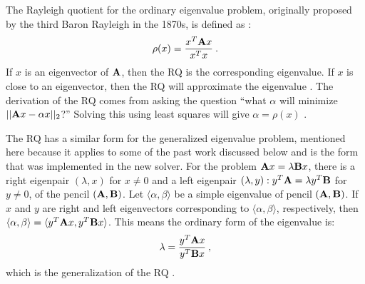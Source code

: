 The Rayleigh quotient for the ordinary eigenvalue problem, originally proposed by the third Baron Rayleigh in the 1870s, is defined as \cite{Parlett1974}:
%
\begin{equation}
  \rho(x) = \frac{x^{T}\mathbf{A}x}{x^{T}x} \:.
  \label{RQ}
\end{equation}
%
If $x$ is an eigenvector of $\mathbf{A}$, then the RQ is the corresponding eigenvalue. If $x$ is close to an eigenvector, then the RQ will approximate the eigenvalue \cite{Stewart2001}. The derivation of the RQ comes from asking the question ``what $\alpha$ will minimize $||\mathbf{A}x - \alpha x||_2$?'' Solving this using least squares will give $\alpha = \rho(x)$ \cite{Trefethen1997}. 

The RQ has a similar form for the generalized eigenvalue problem, mentioned here because it applies to some of the past work discussed below and is the form that was implemented in the new solver. For the problem $\mathbf{A}x = \lambda \mathbf{B}x$, there is a right eigenpair $(\lambda, x)$ for $x \ne 0$ and a left eigenpair $(\lambda, y): y^{T}\mathbf{A} = \lambda y^{T}\mathbf{B}$ for $y \ne 0$, of the pencil $(\mathbf{A}, \mathbf{B})$. Let $\langle \alpha, \beta \rangle$ be a simple eigenvalue of pencil $(\mathbf{A}, \mathbf{B})$. If $x$ and $y$ are right and left eigenvectors corresponding to $\langle \alpha, \beta \rangle$, respectively, then $\langle \alpha, \beta \rangle = \langle y^{T} \mathbf{A} x, y^{T} \mathbf{B} x \rangle$. This means the ordinary form of the eigenvalue is:
\begin{equation}
 \lambda = \frac{y^{T} \mathbf{A} x}{y^{T} \mathbf{B} x} \:,
\end{equation}
which is the generalization of the RQ \cite{Stewart2001}. 

